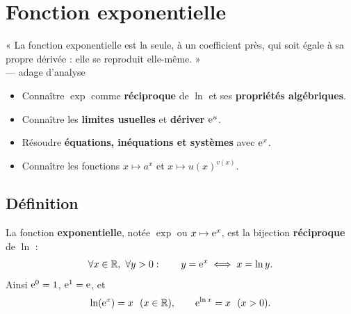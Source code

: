 
\chapter{Fonction exponentielle}

\begin{citationchapitre}
	« La fonction exponentielle est la seule, à un coefficient près, qui soit
	égale à sa propre dérivée : elle se reproduit elle-même. »\\[0.4em]
	— adage d'analyse
\end{citationchapitre}

\begin{objectifs}
	\begin{itemize}[label=\textbullet]
		\item Connaître $\exp$ comme \textbf{réciproque} de $\ln$ et ses
		\textbf{propriétés algébriques}.
		\item Connaître les \textbf{limites usuelles} et \textbf{dériver} $\mathrm{e}^{u}$.
		\item Résoudre \textbf{équations, inéquations et systèmes} avec $\mathrm{e}^{x}$.
		\item Connaître les fonctions $x\mapsto a^{x}$ et $x\mapsto u(x)^{v(x)}$.
	\end{itemize}
\end{objectifs}


\section{Définition}

\begin{definition}
	La fonction \textbf{exponentielle}, notée $\exp$ ou $x\mapsto\mathrm{e}^{x}$, est la
	bijection \textbf{réciproque} de $\ln$ :
	\[
	\forall x\in\mathbb{R},\ \forall y>0:\qquad
	y=\mathrm{e}^{x}\iff x=\ln y.
	\]
	Ainsi $\mathrm{e}^{0}=1$, $\mathrm{e}^{1}=\mathrm{e}$, et
	\[
	\ln(\mathrm{e}^{x})=x \ \ (x\in\mathbb{R}),\qquad
	\mathrm{e}^{\ln x}=x \ \ (x>0).
	\]
\end{definition}

